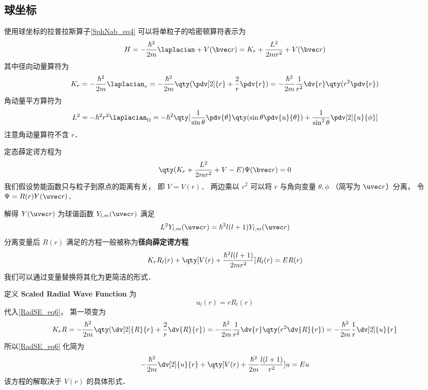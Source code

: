 

\subsection{球坐标}

使用球坐标的拉普拉斯算子\autoref{SphNab_eq4} 可以将单粒子的哈密顿算符表示为
\begin{equation}
H = -\frac{\hbar^2}{2m} \laplacian + V(\bvec r) =  K_r + \frac{L^2}{2mr^2} + V(\bvec r)
\end{equation}
其中径向动量算符为
\begin{equation}
K_r =-\frac{\hbar^2}{2m} \laplacian_r =  - \frac{\hbar^2}{2m} \qty(\pdv[2]{r} + \frac2r \pdv{r}) = -\frac{\hbar^2}{2m}\frac{1}{r^2} \dv{r} \qty(r^2\pdv{r})
\end{equation}
角动量平方算符为%
\begin{equation}\label{RadSE_eq3}
L^2 = -\hbar^2 r^2 \laplacian_\Omega = -\hbar^2 \qty[ \frac{1}{\sin\theta} \pdv{\theta} \qty(\sin \theta \pdv{u}{\theta}) + \frac{1}{\sin^2 \theta} \pdv[2]{u}{\phi}]
\end{equation}
注意角动量算符不含 $r$．

定态薛定谔方程为
\begin{equation}
\qty(K_r + \frac{L^2}{2mr^2} + V - E)\Psi(\bvec r) = 0
\end{equation}
我们假设势能函数只与粒子到原点的距离有关， 即 $V = V(r)$． 两边乘以 $r^2$ 可以将 $r$ 与角向变量 $\theta, \phi$ （简写为 $\uvec r$）分离， 令 $\Psi = R(r)Y(\uvec r)$．

解得 $Y(\uvec r)$ 为球谐函数 $Y_{l,m}(\uvec r)$ 满足
\begin{equation}
L^2 Y_{l,m}(\uvec r) = \hbar^2 l(l+1) Y_{l,m}(\uvec r)
\end{equation}
分离变量后 $R(r)$ 满足的方程一般被称为\textbf{径向薛定谔方程}
\begin{equation}\label{RadSE_eq6}
K_r R_l(r) + \qty[V(r) + \frac{\hbar^2 l(l+1)}{2mr^2} ]R_l(r) = ER(r)
\end{equation}
我们可以通过变量替换将其化为更简洁的形式．

定义 \textbf{Scaled Radial Wave Function} 为
\begin{equation}
u_l(r) = r R_l(r)
\end{equation}
代入\autoref{RadSE_eq6}， 第一项变为
\begin{equation}
K_r R =  - \frac{\hbar^2}{2m} \qty(\dv[2]{R}{r} + \frac2r \dv{R}{r}) = -\frac{\hbar^2}{2m}\frac{1}{r^2} \dv{r} \qty(r^2\dv{R}{r}) =  - \frac{\hbar^2}{2m}\frac1r \dv[2]{u}{r}
\end{equation}
所以\autoref{RadSE_eq6} 化简为
\begin{equation}\label{RadSE_eq1}
-\frac{\hbar^2}{2m} \dv[2]{u}{r} + \qty[V(r) + \frac{\hbar^2}{2m}\frac{l(l + 1)}{r^2}]u = Eu
\end{equation}
该方程的解取决于 $V(r)$ 的具体形式．

